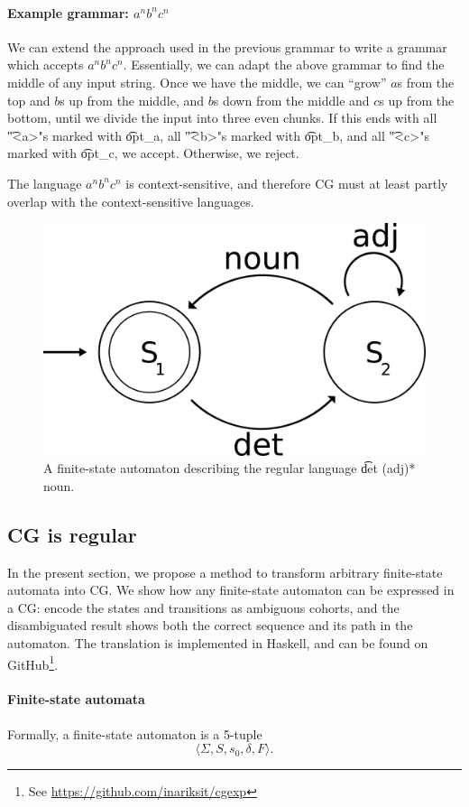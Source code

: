 \paragraph{Example grammar: $a^nb^nc^n$}
We can extend the approach used in the previous grammar to write a grammar which
accepts $a^nb^nc^n$. Essentially, we can adapt the above grammar to find the
middle of any input string. Once we have the middle, we can ``grow'' $a$s from
the top and $b$s up from the middle, and $b$s down from the middle and $c$s up
from the bottom, until we divide the input into three even chunks.
If this ends with all \t{"<a>"}s marked with \t{opt\_a}, all \t{"<b>"}s marked
with \t{opt\_b}, and all \t{"<c>"}s marked with \t{opt\_c}, we accept.
Otherwise, we reject.

The language $a^nb^nc^n$ is context-sensitive, and therefore CG must at least
partly overlap with the context-sensitive languages.

\begin{figure}[h]
  \centering
  \includegraphics[width=0.4\linewidth]{chapters/fsa.png}
  \caption{A finite-state automaton describing the regular language \t{det
      (adj)* noun}.}
 \label{fig:fsa}
\end{figure}

\subsection{CG is regular}\label{sec:regular}
In the present section, we propose a method to transform arbitrary
finite-state automata into CG. We show how any finite-state automaton
can be expressed in a CG: encode the states and transitions as
ambiguous cohorts, and the disambiguated result shows both the correct
sequence and its path in the automaton.  The translation is
implemented in Haskell, and can be found on GitHub\footnote{See
  \url{https://github.com/inariksit/cgexp}}.



\paragraph{Finite-state automata}
Formally, a finite-state automaton is a 5-tuple
\[
  \langle \Sigma, S, s_0, \delta, F \rangle.
\]


